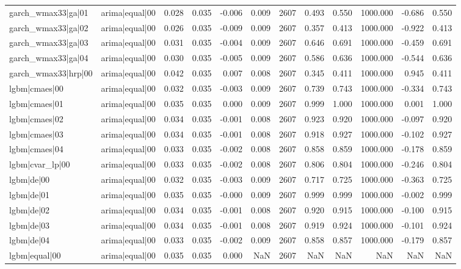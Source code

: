 \begin{table}
\begin{tabular}{llrrrrrrrrrr}
garch\_wmax33|ga|01 & arima|equal|00 & 0.028 & 0.035 & -0.006 & 0.009 & 2607 & 0.493 & 0.550 & 1000.000 & -0.686 & 0.550 \\
garch\_wmax33|ga|02 & arima|equal|00 & 0.026 & 0.035 & -0.009 & 0.009 & 2607 & 0.357 & 0.413 & 1000.000 & -0.922 & 0.413 \\
garch\_wmax33|ga|03 & arima|equal|00 & 0.031 & 0.035 & -0.004 & 0.009 & 2607 & 0.646 & 0.691 & 1000.000 & -0.459 & 0.691 \\
garch\_wmax33|ga|04 & arima|equal|00 & 0.030 & 0.035 & -0.005 & 0.009 & 2607 & 0.586 & 0.636 & 1000.000 & -0.544 & 0.636 \\
garch\_wmax33|hrp|00 & arima|equal|00 & 0.042 & 0.035 & 0.007 & 0.008 & 2607 & 0.345 & 0.411 & 1000.000 & 0.945 & 0.411 \\
lgbm|cmaes|00 & arima|equal|00 & 0.032 & 0.035 & -0.003 & 0.009 & 2607 & 0.739 & 0.743 & 1000.000 & -0.334 & 0.743 \\
lgbm|cmaes|01 & arima|equal|00 & 0.035 & 0.035 & 0.000 & 0.009 & 2607 & 0.999 & 1.000 & 1000.000 & 0.001 & 1.000 \\
lgbm|cmaes|02 & arima|equal|00 & 0.034 & 0.035 & -0.001 & 0.008 & 2607 & 0.923 & 0.920 & 1000.000 & -0.097 & 0.920 \\
lgbm|cmaes|03 & arima|equal|00 & 0.034 & 0.035 & -0.001 & 0.008 & 2607 & 0.918 & 0.927 & 1000.000 & -0.102 & 0.927 \\
lgbm|cmaes|04 & arima|equal|00 & 0.033 & 0.035 & -0.002 & 0.008 & 2607 & 0.858 & 0.859 & 1000.000 & -0.178 & 0.859 \\
lgbm|cvar\_lp|00 & arima|equal|00 & 0.033 & 0.035 & -0.002 & 0.008 & 2607 & 0.806 & 0.804 & 1000.000 & -0.246 & 0.804 \\
lgbm|de|00 & arima|equal|00 & 0.032 & 0.035 & -0.003 & 0.009 & 2607 & 0.717 & 0.725 & 1000.000 & -0.363 & 0.725 \\
lgbm|de|01 & arima|equal|00 & 0.035 & 0.035 & -0.000 & 0.009 & 2607 & 0.999 & 0.999 & 1000.000 & -0.002 & 0.999 \\
lgbm|de|02 & arima|equal|00 & 0.034 & 0.035 & -0.001 & 0.008 & 2607 & 0.920 & 0.915 & 1000.000 & -0.100 & 0.915 \\
lgbm|de|03 & arima|equal|00 & 0.034 & 0.035 & -0.001 & 0.008 & 2607 & 0.919 & 0.924 & 1000.000 & -0.101 & 0.924 \\
lgbm|de|04 & arima|equal|00 & 0.033 & 0.035 & -0.002 & 0.009 & 2607 & 0.858 & 0.857 & 1000.000 & -0.179 & 0.857 \\
lgbm|equal|00 & arima|equal|00 & 0.035 & 0.035 & 0.000 & NaN & 2607 & NaN & NaN & NaN & NaN & NaN \\

\end{tabular}
\end{table}
